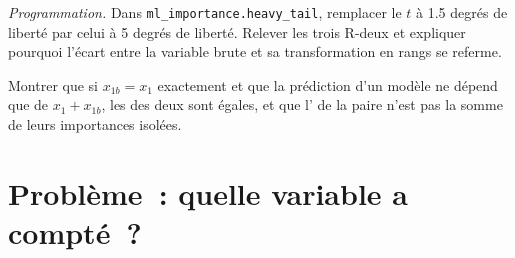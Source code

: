 \begin{exercise}[$\star\star\star$]\label{exo:ml:feature-engineering-selection-and-importance:7}
\emph{Programmation.} Dans \texttt{ml\_importance.heavy\_tail}, remplacer le $t$ à 1.5 degrés de liberté par celui à 5 degrés de liberté. Relever les
trois R-deux et expliquer pourquoi l'écart entre la variable brute et sa transformation en rangs se referme.
\end{exercise}

\begin{exercise}[$\star\star\star$]\label{exo:ml:feature-engineering-selection-and-importance:8}
Montrer que si $x_{1b} = x_1$ exactement et que la prédiction d'un modèle ne dépend que de $x_1 + x_{1b}$, les  des
deux sont égales, et que l' de la paire n'est pas la somme de leurs importances isolées.
\end{exercise}

\section{Problème~: quelle variable a compté~?}

